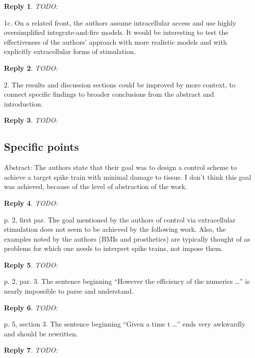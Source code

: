 \documentclass{article}
\newtheorem*{rep}{Reply}
\begin{document}
\begin{rep} TODO: \end{rep}

1c. On a related front, the authors assume intracellular access  and
use highly oversimplified integrate-and-fire models.  It would be interesting to
test the effectiveness of the authors’ approach with more realistic models and
with explicitly extracellular forms of stimulation. 

\begin{rep} TODO: \end{rep}


2. The results and discussion sections could be improved by more context, to
connect specific findings to broader conclusions from the abstract and
introduction. 

\begin{rep} TODO: \end{rep}


\subsection{Specific points}

Abstract: The authors state that their goal was to design a control scheme to
achieve a target spike train with minimal damage to tissue.  I don’t think this
goal was achieved, because of the level of abstraction of the work.


\begin{rep} TODO: \end{rep}

p. 2, first par.  The goal mentioned by the authors of control via extracellular
stimulation does not seem to be achieved by the following work.  Also, the
examples noted by the authors (BMIs and prosthetics) are typically thought of as
problems for which one needs to interpret spike trains, not impose them.


\begin{rep} TODO: \end{rep}

p. 2, par. 3.  The sentence beginning “However the efficiency of the numerics …”
is nearly impossible to parse and understand.


\begin{rep} TODO: \end{rep}

p. 5, section 3.  The sentence beginning “Given a time t …” ends very awkwardly and should be rewritten.

\begin{rep} TODO: \end{rep}
\end{document}

